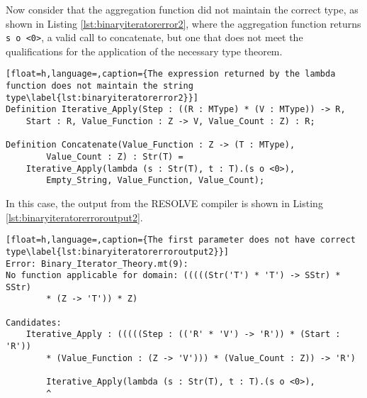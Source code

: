 Now consider that the aggregation function did not maintain the correct type, as shown in Listing \ref{lst:binaryiteratorerror2}, where the aggregation function returns \texttt{s o <0>}, a valid call to concatenate, but one that does not meet the qualifications for the application of the necessary type theorem.  

\begin{lstlisting}[float=h,language=,caption={The expression returned by the lambda function does not maintain the string type\label{lst:binaryiteratorerror2}}]
Definition Iterative_Apply(Step : ((R : MType) * (V : MType)) -> R,
	Start : R, Value_Function : Z -> V, Value_Count : Z) : R;

Definition Concatenate(Value_Function : Z -> (T : MType), 
		Value_Count : Z) : Str(T) = 
	Iterative_Apply(lambda (s : Str(T), t : T).(s o <0>),
		Empty_String, Value_Function, Value_Count);
\end{lstlisting}

In this case, the output from the RESOLVE compiler is shown in Listing \ref{lst:binaryiteratorerroroutput2}.

\begin{lstlisting}[float=h,language=,caption={The first parameter does not have correct type\label{lst:binaryiteratorerroroutput2}}]
Error: Binary_Iterator_Theory.mt(9):
No function applicable for domain: (((((Str('T') * 'T') -> SStr) * SStr) 
		* (Z -> 'T')) * Z)

Candidates:
	Iterative_Apply : (((((Step : (('R' * 'V') -> 'R')) * (Start : 'R')) 
		* (Value_Function : (Z -> 'V'))) * (Value_Count : Z)) -> 'R')

		Iterative_Apply(lambda (s : Str(T), t : T).(s o <0>),
		^
\end{lstlisting}
